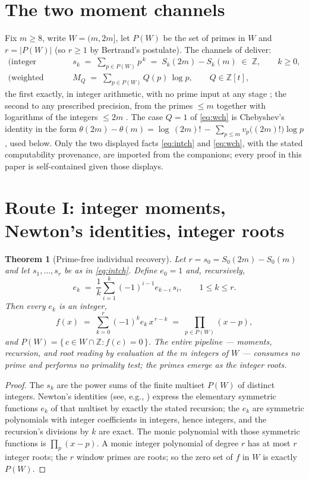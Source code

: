 \documentclass[11pt]{article}
\newtheorem{theorem}{Theorem}
\theoremstyle{remark}
\begin{document}
\section{The two moment channels}

Fix $m \ge 8$, write $W = (m, 2m]$, let $P(W)$ be the set of primes in $W$ and $r = |P(W)|$ (so
$r \ge 1$ by Bertrand's postulate). The channels of \cite{CompanionI, CompanionII} deliver:
\begin{align}
\text{(integer channel)} \qquad & s_k \;=\; \sum_{p \in P(W)} p^{\,k} \;=\; S_k(2m) - S_k(m)
\;\in\; \mathbb{Z}, \qquad k \ge 0,\label{eq:intch}\\
\text{(weighted channel)} \qquad & M_Q \;=\; \sum_{p \in P(W)} Q(p)\, \log p, \qquad Q \in \mathbb{Z}[t],
\label{eq:wch}
\end{align}
the first exactly, in integer arithmetic, with no prime input at any stage \cite{CompanionI}; the
second to any prescribed precision, from the primes $\le m$ together with logarithms of the integers
$\le 2m$ \cite[Prop.~1]{CompanionII}. The case $Q = 1$ of \eqref{eq:wch} is Chebyshev's identity
\cite{Cheb} in the form
$\theta(2m) - \theta(m) = \log\,(2m)! \,-\, \sum_{p \le m} v_p\big((2m)!\big)\log p$, used below. Only the two displayed facts \eqref{eq:intch} and \eqref{eq:wch}, with the stated
computability provenance, are imported from the companions; every proof in this paper is
self-contained given those displays.

\section{Route I: integer moments, Newton's identities, integer roots}

\begin{theorem}[Prime-free individual recovery]\label{thm:int}
Let $r = s_0 = S_0(2m) - S_0(m)$ and let $s_1, \dots, s_r$ be as in \eqref{eq:intch}. Define $e_0 = 1$
and, recursively,
\[
e_k \;=\; \frac{1}{k} \sum_{i=1}^{k} (-1)^{i-1} e_{k-i}\, s_i, \qquad 1 \le k \le r .
\]
Then every $e_k$ is an integer,
\[
f(x) \;=\; \sum_{k=0}^{r} (-1)^k e_k\, x^{\,r-k} \;=\; \prod_{p \in P(W)} (x - p),
\]
and $P(W) = \{\, c \in W \cap \mathbb{Z} : f(c) = 0 \,\}$. The entire pipeline --- moments, recursion,
and root reading by evaluation at the $m$ integers of $W$ --- consumes no prime and performs no
primality test; the primes emerge as the integer roots.
\end{theorem}

\begin{proof}
The $s_k$ are the power sums of the finite multiset $P(W)$ of distinct integers. Newton's identities
(see, e.g., \cite[Ch.~I, \S2]{Macdonald}) express the elementary symmetric functions $e_k$ of that
multiset by exactly the stated recursion; the $e_k$ are symmetric polynomials with integer
coefficients in integers, hence integers, and the recursion's divisions by $k$ are exact. The monic
polynomial with those symmetric functions is $\prod_{p}(x - p)$. A monic integer polynomial of degree
$r$ has at most $r$ integer roots; the $r$ window primes are roots; so the zero set of $f$ in $W$ is
exactly $P(W)$.
\end{proof}
\end{document}
